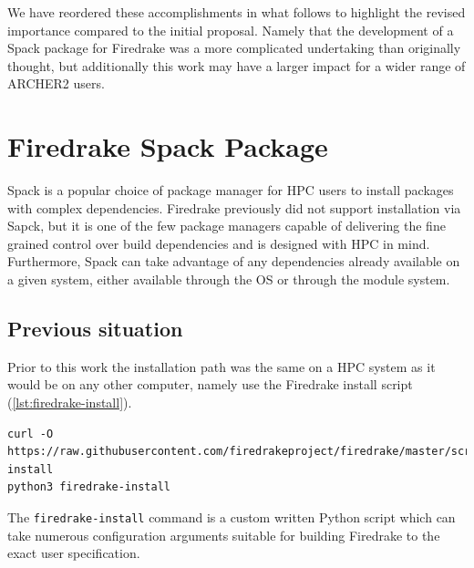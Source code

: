 \documentclass[a4paper,11pt]{article}
\begin{document}
We have reordered these accomplishments in what follows to highlight the revised importance compared to the initial proposal.
Namely that the development of a Spack package for Firedrake was a more complicated undertaking than originally thought, but additionally this work may have a larger impact for a wider range of ARCHER2 users.


\section{Firedrake Spack Package}
\label{sec:spack}
Spack\cite{spackweb,spackpaper} is a popular choice of package manager for HPC users to install packages with complex dependencies.
Firedrake previously did not support installation via Sapck, but it is one of the few package managers capable of delivering the fine grained control over build dependencies and is designed with HPC in mind.
Furthermore, Spack can take advantage of any dependencies already available on a given system, either available through the OS or through the module system.

\subsection{Previous situation}
\label{ssec:prev}
Prior to this work the installation path was the same on a HPC system as it would be on any other computer, namely use the Firedrake install script (\cref{lst:firedrake-install}).
\begin{lstlisting}[float,caption={Firedrake install script install commands},label={lst:firedrake-install}]
curl -O https://raw.githubusercontent.com/firedrakeproject/firedrake/master/scripts/firedrake-install
python3 firedrake-install
\end{lstlisting}
The \verb`firedrake-install` command is a custom written Python script which can take numerous configuration arguments suitable for building Firedrake to the exact user specification.
\end{document}
